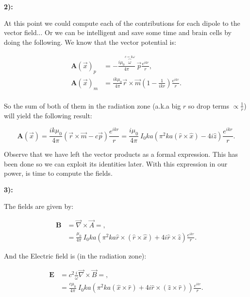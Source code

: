 \textbf{2):}
	
At this point we could compute each of the contributions for each dipole to the vector field... Or we can be intelligent and save some time and brain cells by doing the following. We know that the vector potential is:

\begin{equation}
	\begin{split}
		\mathbf{A}(\vec{x})_{p} &= - \frac{i\mu_{0}\overbrace{\omega}^{c= k \omega}}{4\pi} \: \vec{p} \frac{e^{ikr}}{r},\\
		\mathbf{A}(\vec{x})_{m} &=  \frac{ik\mu_{0}}{4\pi} \vec{r}\times \vec{m}\left(1- \frac{1}{ikr}\right) \frac{e^{ikr}}{r}.\\
	\end{split}
\end{equation}

So the sum of both of them in the radiation zone (a.k.a big $r$ so drop terms $\propto \tfrac{1}{r}$) will yield the following result:

\begin{equation}
	\mathbf{A}(\vec{x}) =  \frac{ik\mu_{0}}{4\pi}\left( \vec{r}\times \vec{m} - c\vec{p}\right)\frac{e^{ikr}}{r} = \frac{i\mu_{0}}{4\pi} \: I_{0}k a \left(\pi^{2} k a(\hat{r}\times \hat{x}) - 4i \hat{z}\right)\frac{e^{ikr}}{r}.
\end{equation}

Observe that we have left the vector products as a formal expression. This has been done so we can exploit its identities later. With this expression in our power, is time to compute the fields.

\textbf{3):}

The fields are given by:

\begin{equation}
	\begin{split}
		\mathbf{B} &= \vec{\nabla}\times \vec{A} =,\\
		&=\frac{\mu_{0}}{4\pi} \: I_{0}k a \left(\pi^{2} k a\hat{r}\times(\hat{r}\times \hat{x}) + 4i\hat{r}\times \hat{z}\right)\frac{e^{ikr}}{r}.
	\end{split}
\end{equation}

And the Electric field is (in the radiation zone):

\begin{equation}
	\begin{split}
		\mathbf{E} &= c^{2} \tfrac{i}{\omega} \vec{\nabla} \times \vec{B} =,\\
		&=\frac{c\mu_{0}}{4\pi} \: I_{0}k a \left(\pi^{2} k a(\hat{x}\times \hat{r}) + 4i\hat{r}\times(\hat{z}\times \hat{r})\right)\frac{e^{ikr}}{r}.
	\end{split}
\end{equation}

